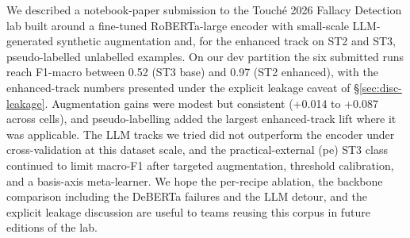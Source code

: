 We described a notebook-paper submission to the Touch\'{e} 2026 Fallacy Detection lab built around a fine-tuned RoBERTa-large encoder with small-scale LLM-generated synthetic augmentation and, for the enhanced track on ST2 and ST3, pseudo-labelled unlabelled examples. On our dev partition the six submitted runs reach F1-macro between 0.52 (ST3 base) and 0.97 (ST2 enhanced), with the enhanced-track numbers presented under the explicit leakage caveat of \S\ref{sec:disc-leakage}. Augmentation gains were modest but consistent (+0.014 to +0.087 across cells), and pseudo-labelling added the largest enhanced-track lift where it was applicable. The LLM tracks we tried did not outperform the encoder under cross-validation at this dataset scale, and the practical-external (\textsf{pe}) ST3 class continued to limit macro-F1 after targeted augmentation, threshold calibration, and a basis-axis meta-learner. We hope the per-recipe ablation, the backbone comparison including the DeBERTa failures and the LLM detour, and the explicit leakage discussion are useful to teams reusing this corpus in future editions of the lab.
